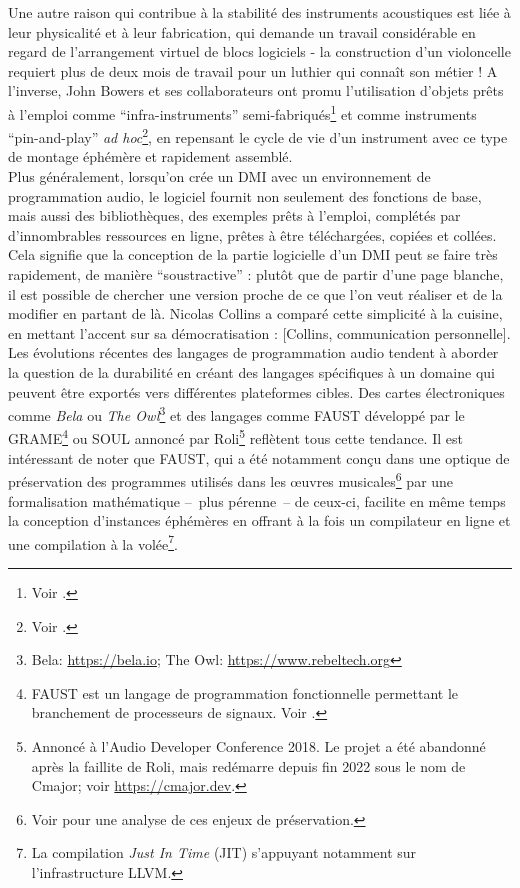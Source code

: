 \noindent Une autre raison qui contribue à la stabilité des instruments acoustiques est liée à leur physicalité et à leur fabrication, qui demande un travail considérable en regard de l'arrangement virtuel de blocs logiciels - la construction d'un violoncelle requiert plus de deux mois de travail pour un luthier qui connaît son métier ! A l'inverse, John Bowers et ses collaborateurs ont promu l'utilisation d'objets prêts à l'emploi comme ``infra-instruments'' semi-fabriqués\footnote{Voir \cite{bowers_not_2005}.} et comme instruments ``pin-and-play'' \textit{ad hoc}\footnote{Voir \cite{bowers_creating_2006}.}, en repensant le cycle de vie d'un instrument avec ce type de montage éphémère et rapidement assemblé.\\
\indent Plus généralement, lorsqu'on crée un \gls{DMI} avec un environnement de programmation audio, le logiciel fournit non seulement des fonctions de base, mais aussi des bibliothèques, des exemples prêts à l'emploi, complétés par d'innombrables ressources en ligne, prêtes à être téléchargées, copiées et collées. Cela signifie que la conception de la partie logicielle d'un \gls{DMI} peut se faire très rapidement, de manière ``soustractive'' : plutôt que de partir d'une page blanche, il est possible de chercher une version proche de ce que l'on veut réaliser et de la modifier en partant de là. Nicolas Collins a comparé cette simplicité à la cuisine, en mettant l'accent sur sa démocratisation :  [Collins, communication personnelle].\\
\indent Les évolutions récentes des langages de programmation audio tendent à aborder la question de la durabilité en créant des langages spécifiques à un domaine qui peuvent être exportés vers différentes plateformes cibles. Des cartes électroniques comme \textit{Bela} ou \textit{The Owl}\footnote{Bela: \url{https://bela.io}; The Owl: \url{https://www.rebeltech.org}} et des langages comme \gls{FAUST} développé par le \gls{GRAME}\footnote{FAUST est un langage de programmation fonctionnelle permettant le branchement de processeurs de signaux. Voir \cite{orlarey_faust_2008}.} ou SOUL annoncé par Roli\footnote{Annoncé à l'Audio Developer Conference 2018. Le projet a été abandonné après la faillite de Roli, mais redémarre depuis fin 2022 sous le nom de Cmajor; voir \url{https://cmajor.dev}.} reflètent tous cette tendance. Il est intéressant de noter que \gls{FAUST}, qui a été notamment conçu dans une optique de préservation des programmes utilisés dans les œuvres musicales\footnote{Voir \cite{barkati_denumeriser_2012} pour une analyse de ces enjeux de préservation.} par une formalisation mathématique --~plus pérenne~-- de ceux-ci, facilite en même temps la conception d'instances éphémères en offrant à la fois un compilateur en ligne et une compilation à la volée\footnote{La compilation \textit{Just In Time} (JIT) s'appuyant notamment sur l'infrastructure \gls{LLVM}.}.
	
